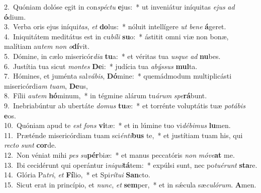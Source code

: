 {2.~}Quóniam dolóse egit in con\textit{spé}\textit{ctu} \textbf{e}jus:~* ut inveniátur iníquitas \textit{e}\textit{jus} \textit{ad} \textbf{ó}dium.\\
{3.~}Verba oris ejus iníqui\textit{tas}, \textit{et} \textbf{do}lus:~* nóluit intellígere \textit{ut} \textit{be}\textit{ne} \textbf{á}geret.\\
{4.~}Iniquitátem meditátus est in cu\textit{bí}\textit{li} \textbf{su}o:~* ástitit omni viæ non bonæ, malítiam au\textit{tem} \textit{non} \textit{o}\textbf{dí}vit.\\
{5.~}Dómine, in cælo misericór\textit{di}\textit{a} \textbf{tu}a:~* et véritas tua \textit{us}\textit{que} \textit{ad} \textbf{nu}bes.\\
{6.~}Justítia tua sicut \textit{mon}\textit{tes} \textbf{De}i:~* judícia tua \textit{a}\textit{býs}\textit{sus} \textbf{mul}ta.\\
{7.~}Hómines, et juménta sal\textit{vá}\textit{bis}, \textbf{Dó}mine:~* quemádmodum multiplicásti misericórdi\textit{am} \textit{tu}\textit{am}, \textbf{De}us,\\
{8.~}Fílii \textit{au}\textit{tem} \textbf{hó}minum,~* in tégmine alárum tu\textit{á}\textit{rum} \textit{spe}\textbf{rá}bunt.\\
{9.~}Inebriabúntur ab ubertáte \textit{do}\textit{mus} \textbf{tu}æ:~* et torrénte voluptátis tuæ \textit{po}\textit{tá}\textit{bis} \textbf{e}os.\\
{10.~}Quóniam apud te \textit{est} \textit{fons} \textbf{vi}tæ:~* et in lúmine tuo vi\textit{dé}\textit{bi}\textit{mus} \textbf{lu}men.\\
{11.~}Præténde misericórdiam tuam sci\textit{én}\textit{ti}\textbf{bus} te,~* et justítiam tuam his, qui \textit{re}\textit{cto} \textit{sunt} \textbf{cor}de.\\
{12.~}Non véniat mihi \textit{pes} \textit{su}\textbf{pér}biæ:~* et manus peccatóris \textit{non} \textit{mó}\textit{ve}\textbf{at} me.\\
{13.~}Ibi cecidérunt qui operántur i\textit{ni}\textit{qui}\textbf{tá}tem:~* expúlsi sunt, nec po\textit{tu}\textit{é}\textit{runt} \textbf{sta}re.\\
{14.~}Glória Pa\textit{tri}, \textit{et} \textbf{Fí}lio,~* et Spi\textit{rí}\textit{tu}\textit{i} \textbf{San}cto.\\
{15.~}Sicut erat in princípio, et \textit{nunc}, \textit{et} \textbf{sem}per,~* et in sǽcula sæ\textit{cu}\textit{ló}\textit{rum}. \textbf{A}men.\\
